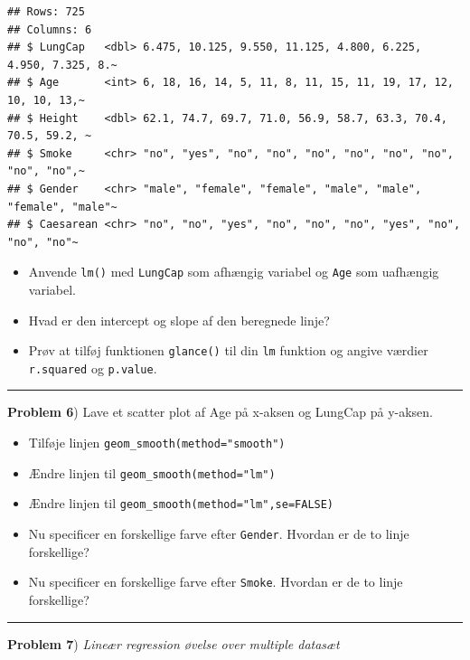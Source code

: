 \documentclass[
]{book}
\providecommand{\tightlist}{%
  \setlength{\itemsep}{0pt}\setlength{\parskip}{0pt}}
\begin{document}
\begin{verbatim}
## Rows: 725
## Columns: 6
## $ LungCap   <dbl> 6.475, 10.125, 9.550, 11.125, 4.800, 6.225, 4.950, 7.325, 8.~
## $ Age       <int> 6, 18, 16, 14, 5, 11, 8, 11, 15, 11, 19, 17, 12, 10, 10, 13,~
## $ Height    <dbl> 62.1, 74.7, 69.7, 71.0, 56.9, 58.7, 63.3, 70.4, 70.5, 59.2, ~
## $ Smoke     <chr> "no", "yes", "no", "no", "no", "no", "no", "no", "no", "no",~
## $ Gender    <chr> "male", "female", "female", "male", "male", "female", "male"~
## $ Caesarean <chr> "no", "no", "yes", "no", "no", "no", "yes", "no", "no", "no"~
\end{verbatim}

\begin{itemize}
\item
  Anvende \texttt{lm()} med \texttt{LungCap} som afhængig variabel og \texttt{Age} som uafhængig variabel.
\item
  Hvad er den intercept og slope af den beregnede linje?
\item
  Prøv at tilføj funktionen \texttt{glance()} til din \texttt{lm} funktion og angive værdier \texttt{r.squared} og \texttt{p.value}.
\end{itemize}

\begin{center}\rule{0.5\linewidth}{0.5pt}\end{center}

\textbf{Problem 6}) Lave et scatter plot af Age på x-aksen og LungCap på y-aksen.

\begin{itemize}
\tightlist
\item
  Tilføje linjen \texttt{geom\_smooth(method="smooth")}
\item
  Ændre linjen til \texttt{geom\_smooth(method="lm")}
\item
  Ændre linjen til \texttt{geom\_smooth(method="lm",se=FALSE)}
\item
  Nu specificer en forskellige farve efter \texttt{Gender}. Hvordan er de to linje forskellige?
\item
  Nu specificer en forskellige farve efter \texttt{Smoke}. Hvordan er de to linje forskellige?
\end{itemize}

\begin{center}\rule{0.5\linewidth}{0.5pt}\end{center}

\textbf{Problem 7}) \emph{Lineær regression øvelse over multiple datasæt}
\end{document}
